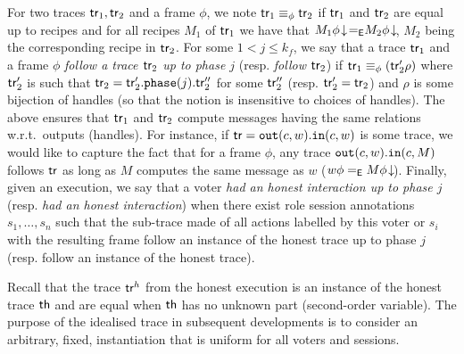 For two traces $\mathsf{tr}_1,\mathsf{tr}_2$ and a frame $\phi$,
we note $\mathsf{tr}_1 \equiv_\phi \mathsf{tr}_2$ if $\mathsf{tr}_1$ and $\mathsf{tr}_2$ are equal up to recipes
and for all recipes $M_1$ of $\mathsf{tr}_1$
we have that $M_1\phi\!\downarrow\!{=_{\mathsf{E}}}M_2\phi\!\downarrow\!$,
$M_2$ being the corresponding recipe in $\mathsf{tr}_2$.
For some $1 < j \le k_f$,
we say that a trace $\mathsf{tr}_1$ and a frame $\phi$ {\em follow a trace $\mathsf{tr}_2$ up to phase $j$} (resp. {\em follow $\mathsf{tr}_2$})
if $\mathsf{tr}_1\equiv_\phi (\mathsf{tr}_2'\rho)$ where
$\mathsf{tr}_2'$ is such that $\mathsf{tr}_2=\mathsf{tr}_2'.\mathtt{phase}(j).\mathsf{tr}_2''$ for some $\mathsf{tr}_2''$
(resp. $\mathsf{tr}_2'=\mathsf{tr}_2$)
and $\rho$ is some bijection of handles (so that the notion is insensitive to choices of handles).
The above ensures that $\mathsf{tr}_1$ and $\mathsf{tr}_2$ compute messages
having the same relations w.r.t.~outputs (handles).
For instance, if $\mathsf{tr}=\mathtt{out}(c,w).\mathtt{in}(c,w)$ is some trace, we would like
to capture the fact that for a frame $\phi$,
any trace $\mathtt{out}(c,w).\mathtt{in}(c,M)$ follows $\mathsf{tr}$
as long as $M$ computes the same message as $w$ (\ie $w\phi=_{\mathsf{E}} M\phi\!\downarrow\!$).
Finally, given an execution,
we say that a voter {\em had an honest interaction up to phase $j$} (resp. {\em had an honest interaction})
when there exist role session annotations $s_1,\ldots, s_n$ such that
the sub-trace made of all actions labelled by this voter or $s_i$ with the resulting frame
follow an instance of the honest trace up to phase $j$ (resp. follow an instance of the honest trace).

Recall that the trace $\mathsf{tr}^h$ from the honest execution is an instance of the honest trace $\mathsf{th}$ and are equal when $\mathsf{th}$ has no
unknown part (\ie second-order variable).
The purpose of the idealised trace in subsequent developments
is to consider an arbitrary, fixed, instantiation that is uniform for all voters and sessions.



